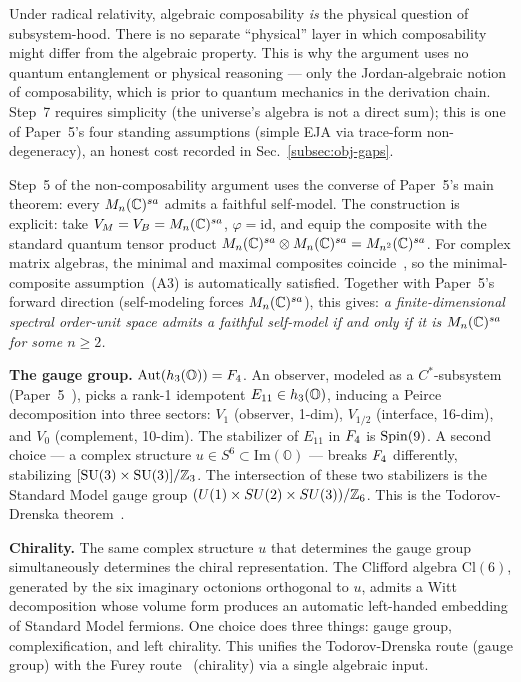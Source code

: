 \begin{remark}
Under radical relativity, algebraic composability \emph{is} the
physical question of subsystem-hood.  There is no separate ``physical''
layer in which composability might differ from the algebraic property.
This is why the argument uses no quantum entanglement or physical
reasoning --- only the Jordan-algebraic notion of composability, which
is prior to quantum mechanics in the derivation chain.  Step~7
requires simplicity (the universe's algebra is not a direct sum); this
is one of Paper~5's four standing assumptions (simple EJA via
trace-form non-degeneracy), an honest cost recorded in
Sec.~\ref{subsec:obj-gaps}.
\end{remark}

\begin{remark}
\label{rem:converse}
Step~5 of the non-composability argument uses the converse of Paper~5's
main theorem: every $M_{n}(\mathbb{C})^{sa}$ admits a faithful self-model.  The
construction is explicit: take $V_M = V_B = M_{n}(\mathbb{C})^{sa}$, $\varphi =
\mathrm{id}$, and equip the composite with the standard quantum tensor
product $M_{n}(\mathbb{C})^{sa} \otimes M_{n}(\mathbb{C})^{sa} = M_{n^2}(\mathbb{C})^{sa}$.  For complex matrix
algebras, the minimal and maximal composites
coincide~\citep{bgw2020}, so the minimal-composite assumption~(A3) is
automatically satisfied.  Together with Paper~5's forward direction
(self-modeling forces $M_{n}(\mathbb{C})^{sa}$), this gives: \emph{a
finite-dimensional spectral order-unit space admits a faithful
self-model if and only if it is $M_{n}(\mathbb{C})^{sa}$ for some $n \ge 2$.}
\end{remark}

\textbf{The gauge group.}  $\mathrm{Aut}(h_3(\mathbb{O})) = F_4$.  An
observer, modeled as a $C^*$-subsystem
(Paper~5~\citep{ehrlich2026qm}), picks a rank-1 idempotent $E_{11}
\in h_3(\mathbb{O})$, inducing a Peirce decomposition into three sectors:
$V_1$ (observer, 1-dim), $V_{1/2}$ (interface, 16-dim), and $V_0$
(complement, 10-dim).  The stabilizer of $E_{11}$ in $F_4$ is
$\mathrm{Spin}(9)$.  A second choice --- a complex structure $u \in S^6
\subset \mathrm{Im}(\mathbb{O})$ --- breaks $F_4$ differently,
stabilizing $[\mathrm{SU}(3) \times \mathrm{SU}(3)] / \mathbb{Z}_3$.  The
intersection of these two stabilizers is the Standard Model gauge
group $(U(1) \times SU(2) \times SU(3))/\mathbb{Z}_6$.  This is the Todorov-Drenska
theorem~\citep{todorovdrenska2018}.

\textbf{Chirality.}  The same complex structure $u$ that determines
the gauge group simultaneously determines the chiral representation.
The Clifford algebra $\mathrm{Cl}(6)$, generated by the six imaginary
octonions orthogonal to $u$, admits a Witt decomposition whose volume
form produces an automatic left-handed embedding of Standard Model
fermions.  One choice does three things: gauge group,
complexification, and left chirality.  This unifies the
Todorov-Drenska route (gauge group) with the Furey
route~\citep{furey2018} (chirality) via a single algebraic input.

